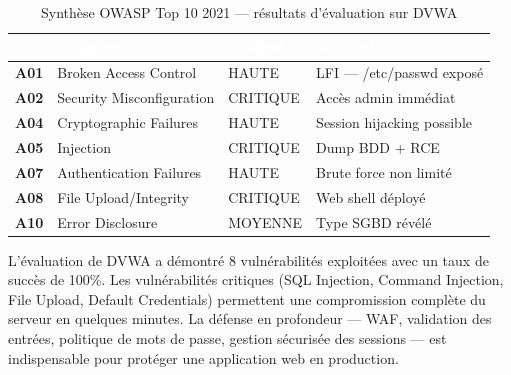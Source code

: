 \documentclass[12pt,a4paper,openany]{report}
\begin{document}
\begin{table}[H]
    \centering
    \renewcommand{\arraystretch}{1.8}
    \setlength{\tabcolsep}{10pt}
    \setlength{\arrayrulewidth}{0.8pt}
    \begin{tabularx}{\textwidth}{|>{\bfseries\centering\arraybackslash}p{1.2cm}|p{4cm}|>{\centering\arraybackslash}p{2.5cm}|X|}
        \arrayrulecolor{tableborder}
        \hline
        \rowcolor{tableheadbg}
        \textcolor{white}{\textbf{ID}} &
        \textcolor{white}{\textbf{Catégorie}} &
        \textcolor{white}{\textbf{Sévérité}} &
        \textcolor{white}{\textbf{Résultat}} \\
        \hline
        \rowcolor{tablerowalt}
        A01 & Broken Access Control & HAUTE & LFI --- /etc/passwd exposé \\
        \hline
        A02 & Security Misconfiguration & CRITIQUE & Accès admin immédiat \\
        \hline
        \rowcolor{tablerowalt}
        A04 & Cryptographic Failures & HAUTE & Session hijacking possible \\
        \hline
        A05 & Injection & CRITIQUE & Dump BDD + RCE \\
        \hline
        \rowcolor{tablerowalt}
        A07 & Authentication Failures & HAUTE & Brute force non limité \\
        \hline
        A08 & File Upload/Integrity & CRITIQUE & Web shell déployé \\
        \hline
        \rowcolor{tablerowalt}
        A10 & Error Disclosure & MOYENNE & Type SGBD révélé \\
        \hline
    \end{tabularx}
    \caption{Synthèse OWASP Top 10 2021 --- résultats d'évaluation sur DVWA}
    \label{tab:dvwa-owasp-summary}
\end{table}

\begin{tcolorbox}[colback=primary!5!white, colframe=primary, title=\textbf{Bilan du Chapitre 6}]
L'évaluation de DVWA a démontré 8 vulnérabilités exploitées avec un taux de succès de 100\%.
Les vulnérabilités critiques (SQL Injection, Command Injection, File Upload, Default Credentials)
permettent une compromission complète du serveur en quelques minutes. La défense en profondeur ---
WAF, validation des entrées, politique de mots de passe, gestion sécurisée des sessions --- est
indispensable pour protéger une application web en production.
\end{tcolorbox}
\end{document}
